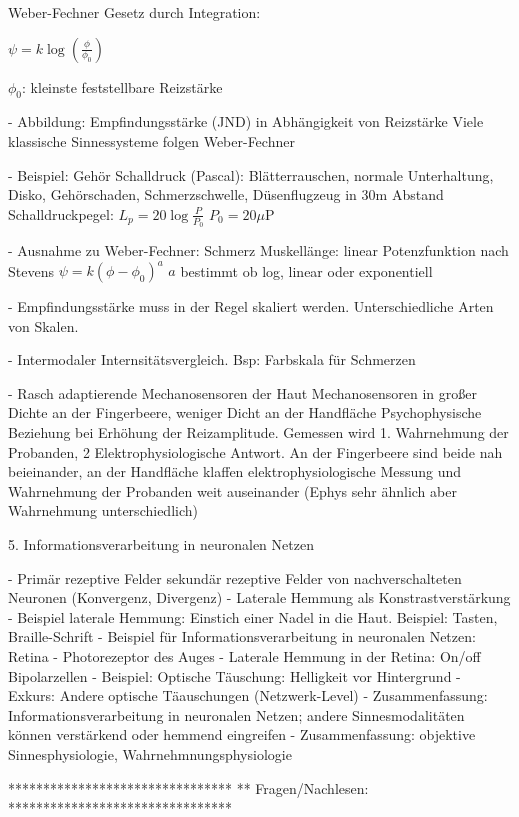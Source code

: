     Weber-Fechner Gesetz durch Integration: 
    
    \(\psi = k\log \left(\frac{\phi}{\phi_0}\right)\)

    \(\phi_0\): kleinste feststellbare Reizstärke

- Abbildung: Empfindungsstärke (JND) in Abhängigkeit von Reizstärke
    Viele klassische Sinnessysteme folgen Weber-Fechner
    
- Beispiel: Gehör
    Schalldruck (Pascal): Blätterrauschen, normale Unterhaltung, Disko, Gehörschaden, Schmerzschwelle, Düsenflugzeug in 30m Abstand
    Schalldruckpegel: \(L_p = 20 \log \frac{P}{P_0}\)
    \(P_0=20 \mu\text{P}\)

- Ausnahme zu Weber-Fechner: Schmerz
    Muskellänge: linear
    Potenzfunktion nach Stevens 
    \( \psi = k(\phi-\phi_0)^a\)
    \(a\) bestimmt ob log, linear oder exponentiell
    
- Empfindungsstärke muss in der Regel skaliert werden. Unterschiedliche Arten von Skalen. 

- Intermodaler Internsitätsvergleich. Bsp: Farbskala für Schmerzen

- Rasch adaptierende Mechanosensoren der Haut
    Mechanosensoren in großer Dichte an der Fingerbeere, weniger Dicht an der Handfläche
    Psychophysische Beziehung bei Erhöhung der Reizamplitude. Gemessen wird 1. Wahrnehmung der Probanden, 2 Elektrophysiologische Antwort.
    An der Fingerbeere sind beide nah beieinander, an der Handfläche klaffen elektrophysiologische Messung und Wahrnehmung der Probanden weit auseinander (Ephys sehr ähnlich aber Wahrnehmung unterschiedlich)

5. Informationsverarbeitung in neuronalen Netzen

- Primär rezeptive Felder
    sekundär rezeptive Felder von nachverschalteten Neuronen (Konvergenz, Divergenz)
- Laterale Hemmung als Konstrastverstärkung
- Beispiel laterale Hemmung: Einstich einer Nadel in die Haut. Beispiel: Tasten, Braille-Schrift
- Beispiel für Informationsverarbeitung in neuronalen Netzen: Retina
- Photorezeptor des Auges
- Laterale Hemmung in der Retina: On/off Bipolarzellen
- Beispiel: Optische Täuschung: Helligkeit vor Hintergrund 
- Exkurs: Andere optische Täauschungen (Netzwerk-Level)
- Zusammenfassung: Informationsverarbeitung in neuronalen Netzen; andere Sinnesmodalitäten können verstärkend oder hemmend eingreifen
- Zusammenfassung: objektive Sinnesphysiologie, Wahrnehmnungsphysiologie


********************************
** Fragen/Nachlesen:
********************************

